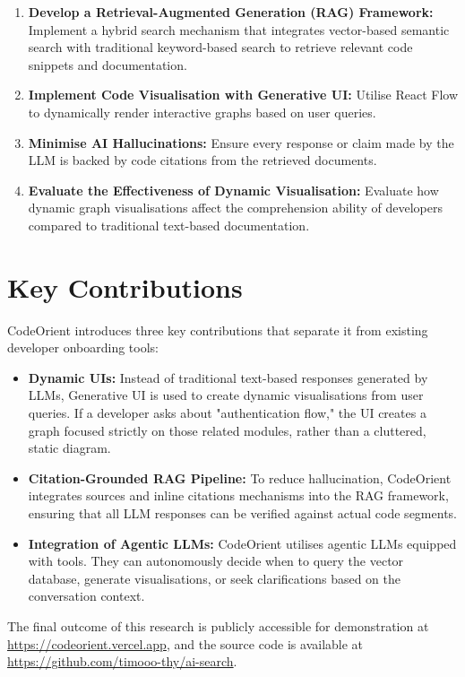 \begin{enumerate}
    \item \textbf{Develop a Retrieval-Augmented Generation (RAG) Framework:} Implement a hybrid search mechanism that integrates vector-based semantic search with traditional keyword-based search to retrieve relevant code snippets and documentation.
    \item \textbf{Implement Code Visualisation with Generative UI:} Utilise React Flow to dynamically render interactive graphs based on user queries.
    \item \textbf{Minimise AI Hallucinations:} Ensure every response or claim made by the LLM is backed by code citations from the retrieved documents.
    \item \textbf{Evaluate the Effectiveness of Dynamic Visualisation:} Evaluate how dynamic graph visualisations affect the comprehension ability of developers compared to traditional text-based documentation.
\end{enumerate}

\section{Key Contributions}
CodeOrient introduces three key contributions that separate it from existing developer onboarding tools:

\begin{itemize}
    \item \textbf{Dynamic UIs:} Instead of traditional text-based responses generated by LLMs, Generative UI is used to create dynamic visualisations from user queries. If a developer asks about "authentication flow," the UI creates a graph focused strictly on those related modules, rather than a cluttered, static diagram.
    \item \textbf{Citation-Grounded RAG Pipeline:} To reduce hallucination, CodeOrient integrates sources and inline citations mechanisms into the RAG framework, ensuring that all LLM responses can be verified against actual code segments.
    \item \textbf{Integration of Agentic LLMs:} CodeOrient utilises agentic LLMs equipped with tools. They can autonomously decide when to query the vector database, generate visualisations, or seek clarifications based on the conversation context.
\end{itemize}

The final outcome of this research is publicly accessible for demonstration at \url{https://codeorient.vercel.app}, and the source code is available at \url{https://github.com/timooo-thy/ai-search}.

